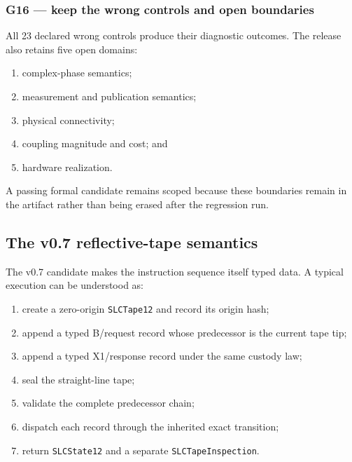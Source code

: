 \subsubsection{G16 --- keep the wrong controls and open
boundaries}\label{viii-ch02-g16-keep-the-wrong-controls-and-open-boundaries}

All 23 declared wrong controls produce their diagnostic outcomes. The
release also retains five open domains:

\begin{enumerate}
\def\labelenumi{\arabic{enumi}.}
\tightlist
\item
  complex-phase semantics;
\item
  measurement and publication semantics;
\item
  physical connectivity;
\item
  coupling magnitude and cost; and
\item
  hardware realization.
\end{enumerate}

A passing formal candidate remains scoped because these boundaries
remain in the artifact rather than being erased after the regression
run.

\subsection{The v0.7 reflective-tape
semantics}\label{viii-ch02-the-v0.7-reflective-tape-semantics}

The v0.7 candidate makes the instruction sequence itself typed data. A
typical execution can be understood as:

\begin{enumerate}
\def\labelenumi{\arabic{enumi}.}
\tightlist
\item
  create a zero-origin \texttt{SLCTape12} and record its origin hash;
\item
  append a typed B/request record whose predecessor is the current tape
  tip;
\item
  append a typed X1/response record under the same custody law;
\item
  seal the straight-line tape;
\item
  validate the complete predecessor chain;
\item
  dispatch each record through the inherited exact transition;
\item
  return \texttt{SLCState12} and a separate \texttt{SLCTapeInspection}.
\end{enumerate}

